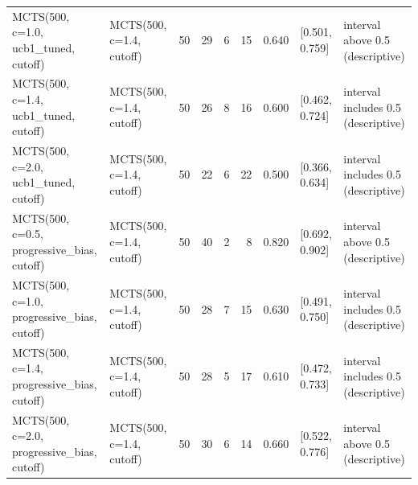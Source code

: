 \begin{table}[!t]
\begin{tabular}{llrrrrrll}
MCTS(500, c=1.0, ucb1\_tuned, cutoff) & MCTS(500, c=1.4, cutoff) & 50 & 29 & 6 & 15 & 0.640 & [0.501, 0.759] & interval above 0.5 (descriptive) \\
MCTS(500, c=1.4, ucb1\_tuned, cutoff) & MCTS(500, c=1.4, cutoff) & 50 & 26 & 8 & 16 & 0.600 & [0.462, 0.724] & interval includes 0.5 (descriptive) \\
MCTS(500, c=2.0, ucb1\_tuned, cutoff) & MCTS(500, c=1.4, cutoff) & 50 & 22 & 6 & 22 & 0.500 & [0.366, 0.634] & interval includes 0.5 (descriptive) \\
MCTS(500, c=0.5, progressive\_bias, cutoff) & MCTS(500, c=1.4, cutoff) & 50 & 40 & 2 & 8 & 0.820 & [0.692, 0.902] & interval above 0.5 (descriptive) \\
MCTS(500, c=1.0, progressive\_bias, cutoff) & MCTS(500, c=1.4, cutoff) & 50 & 28 & 7 & 15 & 0.630 & [0.491, 0.750] & interval includes 0.5 (descriptive) \\
MCTS(500, c=1.4, progressive\_bias, cutoff) & MCTS(500, c=1.4, cutoff) & 50 & 28 & 5 & 17 & 0.610 & [0.472, 0.733] & interval includes 0.5 (descriptive) \\
MCTS(500, c=2.0, progressive\_bias, cutoff) & MCTS(500, c=1.4, cutoff) & 50 & 30 & 6 & 14 & 0.660 & [0.522, 0.776] & interval above 0.5 (descriptive) \\
\bottomrule
\end{tabular}
\end{table}
